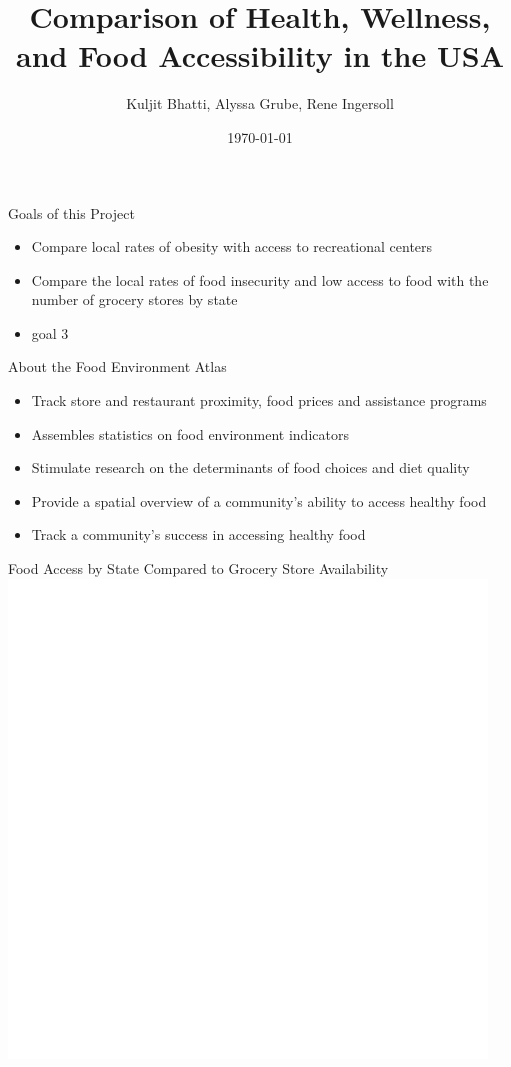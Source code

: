 \documentclass{beamer} %
\title[Comparison of Health, Wellness, and Food Accessibility in the USA ]{Comparison of Health, Wellness, and Food Accessibility in the USA }
\institute[UNL]{University of Nebraska-Lincoln}
\author{Kuljit Bhatti, Alyssa Grube, Rene Ingersoll}
\date{\today}
\begin{document}
	
	\begin{frame}
		\titlepage
	\end{frame}
	
	
	
	\begin{frame}{Goals of this Project}
		\begin{itemize}
			\item Compare local rates of obesity with access to recreational centers  
			\item Compare the local rates of food insecurity and low access to food with the number of grocery stores by state  
			\item goal 3 
		\end{itemize}
	\end{frame}
	
	
	\begin{frame}{About the Food Environment Atlas} 
		\begin{itemize}
			\item Track store and restaurant proximity, food prices and assistance programs 
			\item Assembles statistics on food environment indicators 
			\item Stimulate research on the determinants of food choices and diet quality 
			\item Provide a spatial overview of a community's ability to access healthy food 
			\item Track a community's success in accessing healthy food 
		\end{itemize}
	\end{frame}

\begin{frame}{Food Access by State Compared to Grocery Store Availability}
	\includegraphics{grocplot} 

	\end{frame}
	
\end{document}
